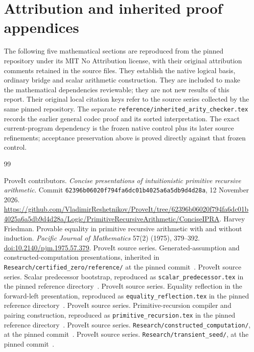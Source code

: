 \documentclass[11pt,a4paper]{article}
\theoremstyle{definition}\newtheorem{definition}[theorem]{Definition}
\theoremstyle{remark}\newtheorem{remark}[theorem]{Remark}
\begin{document}
\section{Attribution and inherited proof appendices}
The following five mathematical sections are reproduced from the pinned
repository under its MIT No Attribution license, with their original
attribution comments retained in the source files. They establish the
native logical basis, ordinary bridge and scalar arithmetic construction.
They are included to make the mathematical dependencies reviewable; they
are not new results of this report. Their original local citation keys
refer to the source series collected by the same pinned repository.
The separate \texttt{reference/inherited\_arity\_checker.tex} records the
earlier general codec proof and its sorted interpretation. The exact
current-program dependency is the frozen native control plus its later
source refinements; acceptance preservation above is proved directly
against that frozen control.







\begin{thebibliography}{99}
\raggedright
{}
ProveIt contributors. \emph{Concise presentations of intuitionistic
primitive recursive arithmetic}. Commit
\texttt{62396b06020f794fa6dc01b4025a6a5db9d4d28a}, 12 November 2026.
\url{https://github.com/VladimirReshetnikov/ProveIt/tree/62396b06020f794fa6dc01b4025a6a5db9d4d28a/Logic/PrimitiveRecursiveArithmetic/ConciseIPRA}.
Harvey Friedman. Provable equality in primitive recursive arithmetic
with and without induction. \emph{Pacific Journal of Mathematics}
57(2) (1975), 379--392.
\href{https://doi.org/10.2140/pjm.1975.57.379}{doi:10.2140/pjm.1975.57.379}.
ProveIt source series. Generated-assumption and constructed-computation
presentations, inherited in \texttt{Research/certified\_zero/reference/}
at the pinned commit~\cite{corpus}.
ProveIt source series. Scalar predecessor bootstrap, reproduced as
\texttt{scalar\_predecessor.tex} in the pinned reference directory~\cite{corpus}.
ProveIt source series. Equality reflection in the forward-left presentation,
reproduced as \texttt{equality\_reflection.tex} in the pinned reference
directory~\cite{corpus}.
ProveIt source series. Primitive-recursion compiler and pairing construction,
reproduced as \texttt{primitive\_recursion.tex} in the pinned reference
directory~\cite{corpus}.
ProveIt source series. \texttt{Research/constructed\_computation/},
at the pinned commit~\cite{corpus}.
ProveIt source series. \texttt{Research/transient\_seed/},
at the pinned commit~\cite{corpus}.
\end{thebibliography}
\end{document}
